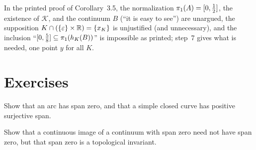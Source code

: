 
\begin{remark}
In the printed proof of Corollary~3.5, the normalization $\pi_{1}(A)=[0,\frac12]$, the existence of $\mathcal K$, and the continuum $B$ (``it is easy to see'') are
unargued, the supposition $K\cap(\left\{ \varepsilon \right\}\times\mathbb{R})=\left\{ x_K \right\}$ is unjustified (and unnecessary), and the inclusion ``$[0,\frac58]\subseteq\pi_{1}(h_K(B))$'' is
impossible as printed; step~7 gives what is needed, one point $y$ for all $K$.
\end{remark}

\section*{Exercises}

\begin{exercise}
Show that an arc has span zero, and that a simple closed curve has positive surjective span.
\end{exercise}

\begin{exercise}
Show that a continuous image of a continuum with span zero need not have span zero, but that span zero is a topological invariant.
\end{exercise}
